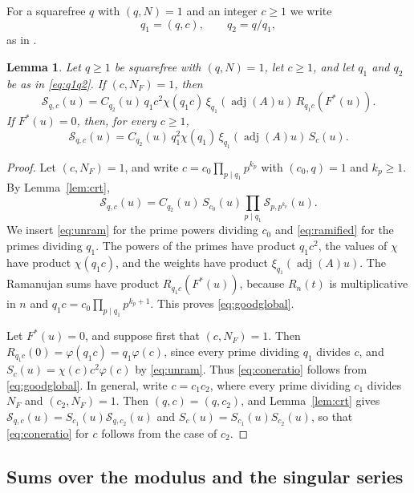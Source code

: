 \documentclass[11pt]{amsart}
\numberwithin{equation}{section}
\numberwithin{figure}{section}
\newtheorem{lemma}{Lemma}[section]
\theoremstyle{definition}
\newcommand{\adj}{\operatorname{adj}}
\begin{document}
For a squarefree $q$ with $(q,N)=1$ and an integer $c\ge1$ we write
\begin{equation}\label{eq:q1q2}
 q_1=(q,c),\qquad q_2=q/q_1,
\end{equation}
as in \cite{IM}.

\begin{lemma}\label{lem:goodglobal}
Let $q\ge1$ be squarefree with $(q,N)=1$, let $c\ge1$, and let $q_1$
and $q_2$ be as in \eqref{eq:q1q2}. If $(c,N_F)=1$, then
\begin{equation}\label{eq:goodglobal}
 \mathcal S_{q,c}(u)
 =C_{q_2}(u)\,q_1c^2\chi(q_1c)\,\xi_{q_1}(\adj(A)u)\,R_{q_1c}(F^*(u)).
\end{equation}
If $F^*(u)=0$, then, for every $c\ge1$,
\begin{equation}\label{eq:coneratio}
 \mathcal S_{q,c}(u)
 =C_{q_2}(u)\,q_1^2\chi(q_1)\,\xi_{q_1}(\adj(A)u)\,S_c(u).
\end{equation}
\end{lemma}

\begin{proof}
Let $(c,N_F)=1$, and write $c=c_0\prod_{p\mid q_1}p^{k_p}$ with
$(c_0,q)=1$ and $k_p\ge1$. By Lemma~\ref{lem:crt},
\[
 \mathcal S_{q,c}(u)=C_{q_2}(u)\,S_{c_0}(u)
 \prod_{p\mid q_1}\mathcal S_{p,p^{k_p}}(u).
\]
We insert \eqref{eq:unram} for the prime powers dividing $c_0$ and
\eqref{eq:ramified} for the primes dividing $q_1$. The powers of the
primes have product $q_1c^2$, the values of $\chi$ have product
$\chi(q_1c)$, and the weights have product $\xi_{q_1}(\adj(A)u)$.
The Ramanujan sums have product $R_{q_1c}(F^*(u))$, because
$R_n(t)$ is multiplicative in $n$ and
$q_1c=c_0\prod_{p\mid q_1}p^{k_p+1}$. This proves
\eqref{eq:goodglobal}.

Let $F^*(u)=0$, and suppose first that $(c,N_F)=1$. Then
$R_{q_1c}(0)=\varphi(q_1c)=q_1\varphi(c)$, since every prime dividing
$q_1$ divides $c$, and $S_c(u)=\chi(c)c^2\varphi(c)$ by
\eqref{eq:unram}. Thus \eqref{eq:coneratio} follows from
\eqref{eq:goodglobal}. In general, write $c=c_1c_2$, where every
prime dividing $c_1$ divides $N_F$ and $(c_2,N_F)=1$. Then
$(q,c)=(q,c_2)$, and Lemma~\ref{lem:crt} gives
$\mathcal S_{q,c}(u)=S_{c_1}(u)\mathcal S_{q,c_2}(u)$ and
$S_c(u)=S_{c_1}(u)S_{c_2}(u)$, so that \eqref{eq:coneratio} for $c$
follows from the case of $c_2$.
\end{proof}

\subsection{Sums over the modulus and the singular series}\label{sec:moduli}
\end{document}

